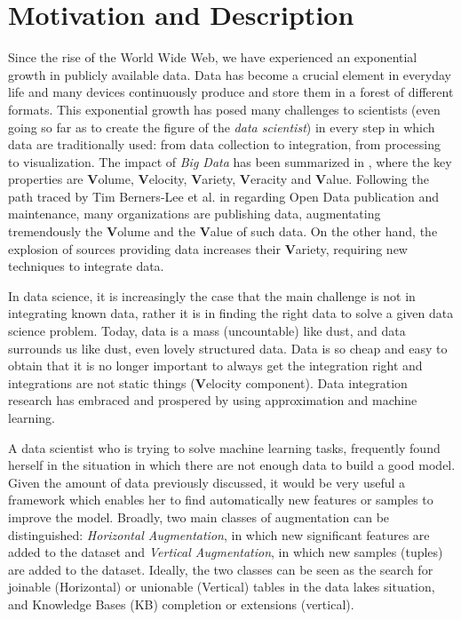 \section{Motivation and Description}\label{motivations}

Since the rise of the World Wide Web, we have experienced an exponential growth in publicly available data. Data has become a crucial element in everyday life and many devices continuously produce and store them in a forest of different formats. This exponential growth has posed many challenges to scientists (even going so far as to create the figure of the \textit{data scientist}) in every step in which data are traditionally used: from data collection to integration, from processing to visualization. The impact of \textit{Big Data} has been summarized in \cite{mcafee2012big}, where the key properties are \textbf{V}olume, \textbf{V}elocity, \textbf{V}ariety, \textbf{V}eracity and \textbf{V}alue. Following the path traced by Tim Berners-Lee et al. in \cite{bizer2009linked} regarding Open Data publication and maintenance, many organizations are publishing data, augmentating tremendously the \textbf{V}olume and the \textbf{V}alue of such data. On the other hand, the explosion of sources providing data increases their \textbf{V}ariety, requiring new techniques to integrate data.

In data science, it is increasingly the case that the main challenge is not in integrating known data, rather it is in finding the right data to solve a given data science problem. Today, data is a mass (uncountable) like dust, and data surrounds us like dust, even lovely structured data. Data is so cheap and easy to obtain that it is no longer important to always get the integration right and integrations are not static things (\textbf{V}elocity component). Data integration research has embraced and prospered by using approximation and machine learning. 

A data scientist who is trying to solve machine learning tasks, frequently found herself in the situation in which there are not enough data to build a good model. Given the amount of data previously discussed, it would be very useful a framework which enables her to find automatically new features or samples to improve the model. Broadly, two main classes of augmentation can be distinguished: \textit{Horizontal Augmentation}, in which new significant features are added to the dataset and \textit{Vertical Augmentation}, in which new samples (tuples) are added to the dataset. Ideally, the two classes can be seen as the search for joinable (Horizontal) or unionable (Vertical) tables in the data lakes situation, and Knowledge Bases (KB) completion or extensions (vertical).

